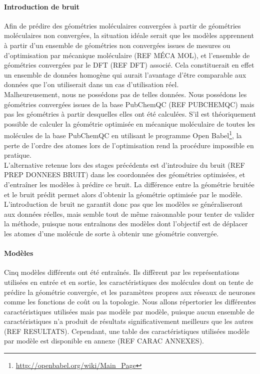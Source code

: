 \paragraph{Introduction de bruit} Afin de prédire des géométries moléculaires convergées à partir de géométries moléculaires non convergées, la situation idéale serait que les modèles apprennent à partir d'un ensemble de géométries non convergées issues de mesures ou d'optimisation par mécanique moléculaire (REF MÉCA MOL), et l'ensemble de géométries convergées par le DFT (REF DFT) associé. Cela constituerait en effet un ensemble de données homogène qui aurait l'avantage d'être comparable aux données que l'on utiliserait dans un cas d'utilisation réel.\\
Malheureusement, nous ne possédons pas de telles données. Nous possédons les géométries convergées issues de la base PubChemQC (REF PUBCHEMQC) mais pas les géométries à partir desquelles elles ont été calculées. S'il est théoriquement possible de calculer la géométrie optimisée en mécanique moléculaire de toutes les molécules de la base PubChemQC en utilisant le programme Open Babel\footnote{\url{http://openbabel.org/wiki/Main_Page}}, la perte de l'ordre des atomes lors de l'optimisation rend la procédure impossible en pratique.\\
L'alternative retenue lors des stages précédents est d'introduire du bruit (REF PREP DONNEES BRUIT) dans les coordonnées des géométries optimisées, et d'entraîner les modèles à prédire ce bruit. La différence entre la géométrie bruitée et le bruit prédit permet alors d'obtenir la géométrie optimisée par le modèle. L'introduction de bruit ne garantit donc pas que les modèles se généraliseront aux données réelles, mais semble tout de même raisonnable pour tenter de valider la méthode, puisque nous entraînons des modèles dont l'objectif est de déplacer les atomes d'une molécule de sorte à obtenir une géométrie convergée.

\paragraph{Modèles} Cinq modèles différents ont été entraînés. Ils diffèrent par les représentations utilisées en entrée et en sortie, les caractéristiques des molécules dont on tente de prédire la géométrie convergée, et les paramètres propres aux réseaux de neurones comme les fonctions de coût ou la topologie. Nous allons répertorier les différentes caractéristiques utilisées mais pas modèle par modèle, puisque aucun ensemble de caractéristiques n'a produit de résultats significativement meilleurs que les autres (REF RESULTATS). Cependant, une table des caractéristiques utilisées modèle par modèle est disponible en annexe (REF CARAC ANNEXES).


